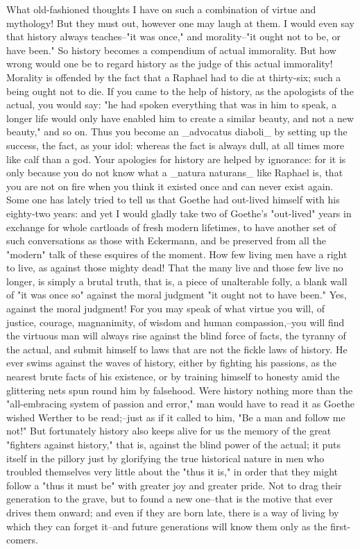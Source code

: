 What old-fashioned thoughts I have on such a combination of virtue
and mythology! But they must out, however one may laugh at them. I
would even say that history always teaches--"it was once," and
morality--"it ought not to be, or have been." So history becomes a
compendium of actual immorality. But how wrong would one be to regard
history as the judge of this actual immorality! Morality is offended
by the fact that a Raphael had to die at thirty-six; such a being
ought not to die. If you came to the help of history, as the
apologists of the actual, you would say: "he had spoken everything
that was in him to speak, a longer life would only have enabled him
to create a similar beauty, and not a new beauty," and so on. Thus
you become an _advocatus diaboli_ by setting up the success, the
fact, as your idol: whereas the fact is always dull, at all times
more like calf than a god. Your apologies for history are helped by
ignorance: for it is only because you do not know what a _natura
naturans_ like Raphael is, that you are not on fire when you think it
existed once and can never exist again. Some one has lately tried to
tell us that Goethe had out-lived himself with his eighty-two years:
and yet I would gladly take two of Goethe's "out-lived" years in
exchange for whole cartloads of fresh modern lifetimes, to have
another set of such conversations as those with Eckermann, and be
preserved from all the "modern" talk of these esquires of the moment.
How few living men have a right to live, as against those mighty
dead! That the many live and those few live no longer, is simply a
brutal truth, that is, a piece of unalterable folly, a blank wall of
"it was once so" against the moral judgment "it ought not to have
been." Yes, against the moral judgment! For you may speak of what
virtue you will, of justice, courage, magnanimity, of wisdom and
human compassion,--you will find the virtuous man will always rise
against the blind force of facts, the tyranny of the actual, and
submit himself to laws that are not the fickle laws of history. He
ever swims against the waves of history, either by fighting his
passions, as the nearest brute facts of his existence, or by training
himself to honesty amid the glittering nets spun round him by
falsehood. Were history nothing more than the "all-embracing system
of passion and error," man would have to read it as Goethe wished
Werther to be read;--just as if it called to him, "Be a man and
follow me not!" But fortunately history also keeps alive for us the
memory of the great "fighters against history," that is, against the
blind power of the actual; it puts itself in the pillory just by
glorifying the true historical nature in men who troubled themselves
very little about the "thus it is," in order that they might follow a
"thus it must be" with greater joy and greater pride. Not to drag
their generation to the grave, but to found a new one--that is the
motive that ever drives them onward; and even if they are born late,
there is a way of living by which they can forget it--and future
generations will know them only as the first-comers.


